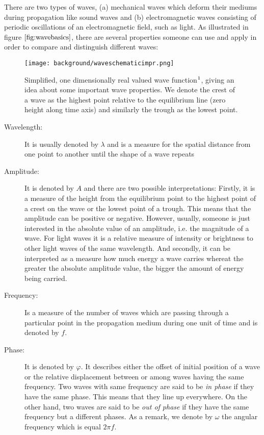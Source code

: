 There are two types of waves, (a) mechanical waves which deform their mediums during propagation like sound waves and (b) electromagnetic waves consisting of periodic oscillations of an electromagnetic field, such as light. As illustrated in figure $\ref{fig:wavebasics}$, there are several properties someone can use and apply in order to compare and distinguish different waves:

\begin{figure}[H]
  \centering
  \texttt{[image: background/waveschematicimpr.png]}
  \caption[Sinewave]{Simplified, one dimensionally real valued wave function$\footnotemark$, giving an idea about some important wave properties. We denote the crest of a wave as the highest point relative to the equilibrium line (zero height along time axis) and similarly the trough as the lowest point.}
  \label{fig:wavebasics}
\end{figure}

\begin{description}
  \item[Wavelength:] It is usually denoted by $\lambda$ and is a measure for the spatial distance from one point to another until the shape of a wave repeats
  \item[Amplitude:] It is denoted by $A$ and there are two possible interpretations: Firstly, it is a measure of the height from the equilibrium point to the highest point of a crest on the wave or the lowest point of a trough. This means that the amplitude can be positive or negative. However, usually, someone is just interested in the absolute value of an amplitude, i.e. the magnitude of a wave. For light waves it is a relative measure of intensity or brightness to other light waves of the same wavelength. And secondly, it can be interpreted as a measure how much energy a wave carries whereat the greater the absolute amplitude value, the bigger the amount of energy being carried.
  \item[Frequency:] Is a measure of the number of waves which are passing through a particular point in the propagation medium during one unit of time and is denoted by $f$.
  \item[Phase:] It is denoted by $\varphi$. It describes either the offset of initial position of a wave or the relative displacement between or among waves having the same frequency. Two waves with same frequency are said to be \emph{in phase} if they have the same phase. This means that they line up everywhere. On the other hand, two waves are said to be \emph{out of phase} if they have the same frequency but a different phases. As a remark, we denote by $\omega$ the angular frequency which is equal $2\pi f$. 
\end{description}

